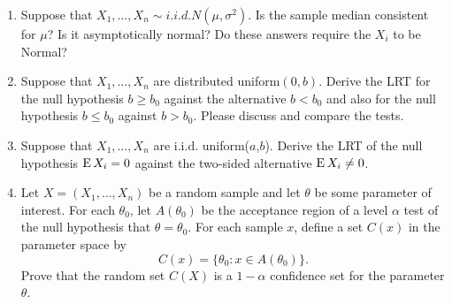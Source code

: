 \begin{enumerate}
\item Suppose that $X_1,\dots,X_n \sim i.i.d. N(\mu, \sigma^2)$.  Is
  the sample median consistent for $\mu$?  Is it asymptotically
  normal?  Do these answers require the $X_i$ to be Normal?

\item Suppose that $X_1,\dots,X_n$ are distributed uniform$(0,b)$.
  Derive the LRT for the null hypothesis $b \geq b_0$ against the
  alternative $b < b_0$ and also for the null hypothesis $b \leq b_0$
  against $b > b_0$.  Please discuss and compare the tests.

\item Suppose that $X_1,\dots,X_n$ are i.i.d. uniform($a$,$b$).
  Derive the LRT of the null hypothesis $\operatorname{E} X_i = 0$ against the
  two-sided alternative $\operatorname{E} X_i \neq 0$.

\item Let $X = (X_1,\dots,X_n)$ be a random sample and let $\theta$ be
  some parameter of interest.  For each $\theta_0$, let $A(\theta_0)$
  be the acceptance region of a level $\alpha$ test of the null
  hypothesis that $\theta = \theta_0$.  For each sample $x$, define a
  set $C(x)$ in the parameter space by
  \begin{equation}
     C(x) = \{ \theta_0 : x \in A(\theta_0) \}.
  \end{equation}
  Prove that the random set $C(X)$ is a $1-\alpha$ confidence set for the
  parameter $\theta$.

\end{enumerate}

